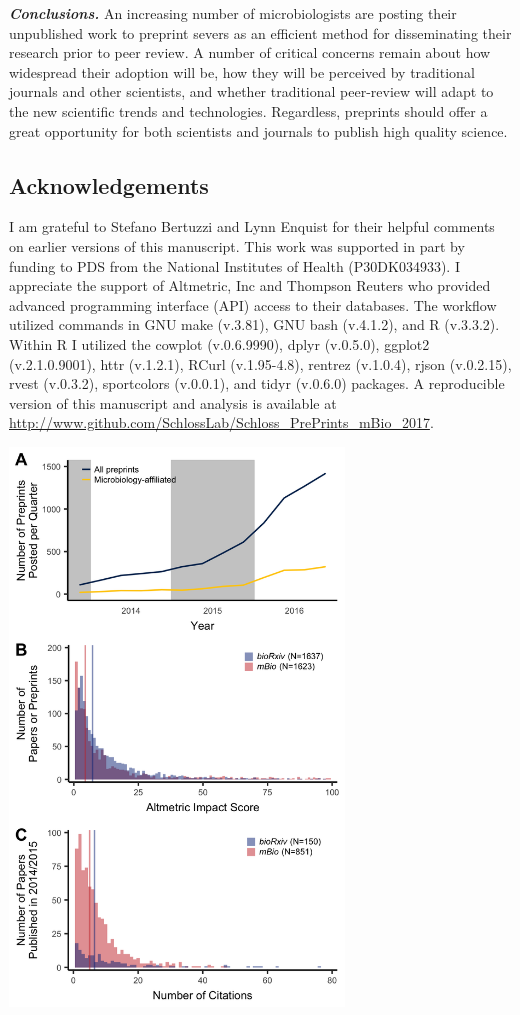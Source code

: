 \documentclass[11pt,]{article}
\begin{document}
\textbf{\emph{Conclusions.}} An increasing number of microbiologists are
posting their unpublished work to preprint severs as an efficient method
for disseminating their research prior to peer review. A number of
critical concerns remain about how widespread their adoption will be,
how they will be perceived by traditional journals and other scientists,
and whether traditional peer-review will adapt to the new scientific
trends and technologies. Regardless, preprints should offer a great
opportunity for both scientists and journals to publish high quality
science.

\subsection{Acknowledgements}\label{acknowledgements}

I am grateful to Stefano Bertuzzi and Lynn Enquist for their helpful
comments on earlier versions of this manuscript. This work was supported
in part by funding to PDS from the National Institutes of Health
(P30DK034933). I appreciate the support of Altmetric, Inc and Thompson
Reuters who provided advanced programming interface (API) access to
their databases. The workflow utilized commands in GNU make (v.3.81),
GNU bash (v.4.1.2), and R (v.3.3.2). Within R I utilized the cowplot
(v.0.6.9990), dplyr (v.0.5.0), ggplot2 (v.2.1.0.9001), httr (v.1.2.1),
RCurl (v.1.95-4.8), rentrez (v.1.0.4), rjson (v.0.2.15), rvest
(v.0.3.2), sportcolors (v.0.0.1), and tidyr (v.0.6.0) packages. A
reproducible version of this manuscript and analysis is available at
\url{http://www.github.com/SchlossLab/Schloss_PrePrints_mBio_2017}.

\newpage

\includegraphics[width=3.5in]{../figures/figure1.png}
\end{document}
